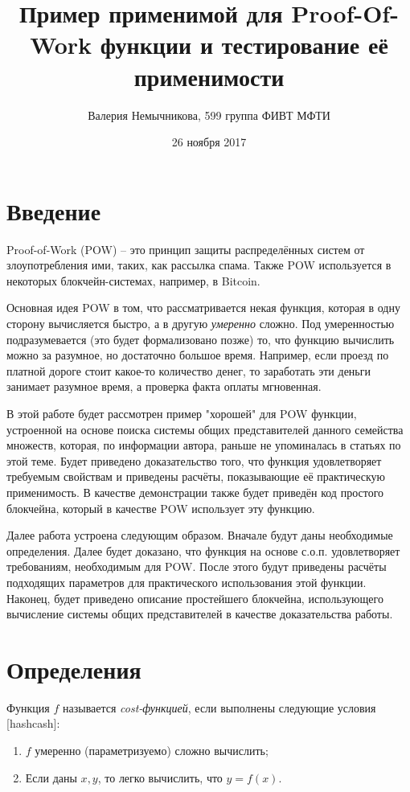\documentclass{article}
\title{Пример применимой для Proof-Of-Work функции и тестирование её применимости}
\date{26 ноября 2017}
\author{Валерия Немычникова, 599 группа ФИВТ МФТИ}
\begin{document}
\maketitle


\section{Введение}

    Proof-of-Work (POW) -- это принцип защиты распределённых систем от злоупотребления ими, таких, как рассылка спама. Также POW используется в некоторых блокчейн-системах, например, в Bitcoin.

    Основная идея POW в том, что рассматривается некая функция, которая в одну сторону вычисляется быстро, а в другую \textit{умеренно} сложно. Под умеренностью подразумевается (это будет формализовано позже) то, что функцию вычислить можно за разумное, но достаточно большое время. Например, если проезд по платной дороге стоит какое-то количество денег, то заработать эти деньги занимает разумное время, а проверка факта оплаты мгновенная.

    В этой работе будет рассмотрен пример "хорошей" для POW функции, устроенной на основе поиска системы общих представителей данного семейства множеств, которая, по информации автора, раньше не упоминалась в статьях по этой теме. Будет приведено доказательство того, что функция удовлетворяет требуемым свойствам и приведены расчёты, показывающие её практическую применимость. В качестве демонстрации также будет приведён код простого блокчейна, который в качестве POW использует эту функцию.

    Далее работа устроена следующим образом. Вначале будут даны необходимые определения. Далее будет доказано, что функция на основе с.о.п. удовлетворяет требованиям, необходимым для POW. После этого будут приведены расчёты подходящих параметров для практического использования этой функции. Наконец, будет приведено описание простейшего блокчейна, использующего вычисление системы общих представителей в качестве доказательства работы.
\section{Определения}

Функция $f$ называется \textit{cost-функцией}, если выполнены следующие условия [hashcash]:
\begin{enumerate}
\item $f$ умеренно (параметризуемо) сложно вычислить;
\item Если даны $x, y$, то легко вычислить, что $y = f(x)$.

\end{enumerate}
\end{document}
